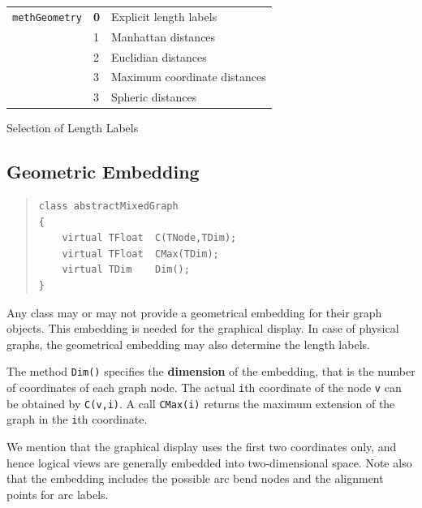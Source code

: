\documentclass[a4paper,11pt,twoside]{book}
\begin{document}
\begin{multicols}{2}
\bigskip
\begin{tablehere}
\begin{center}
\begin{tabular}{|l|l|l|}
\hline
\verb/methGeometry/ & {\bf 0} & Explicit length labels \\
                    & 1 & Manhattan distances \\
                    & 2 & Euclidian distances \\
                    & 3 & Maximum coordinate distances \\
                    & 3 & Spheric distances \\
\hline
\end{tabular}
\end{center}
\caption{\label{tlb_metric_options}Selection of Length Labels}
\end{tablehere}


\subsection{Geometric Embedding}
\label{slb_geo}
\methods
\begin{quote}
\begin{verbatim}
class abstractMixedGraph
{
    virtual TFloat  C(TNode,TDim);
    virtual TFloat  CMax(TDim);
    virtual TDim    Dim();
}
\end{verbatim}
\end{quote}
Any class may or may not provide a geometrical embedding for their
graph objects. This embedding is needed for the graphical display. In case
of physical graphs, the geometrical embedding may also determine the length
labels.

The method \verb/Dim()/ specifies the {\bf dimension}
 of the embedding, that is
the number of coordinates of each graph node. The actual \verb/i/th coordinate
of the node \verb/v/ can be obtained by \verb/C(v,i)/. A call \verb/CMax(i)/
returns the maximum extension of the graph in the \verb/i/th coordinate.

We mention that the graphical display uses the first two coordinates only,
and hence logical views are generally embedded into two-dimensional space.
Note also that the embedding includes the possible arc bend nodes and the
alignment points for arc labels.



\end{multicols}
\end{document}
